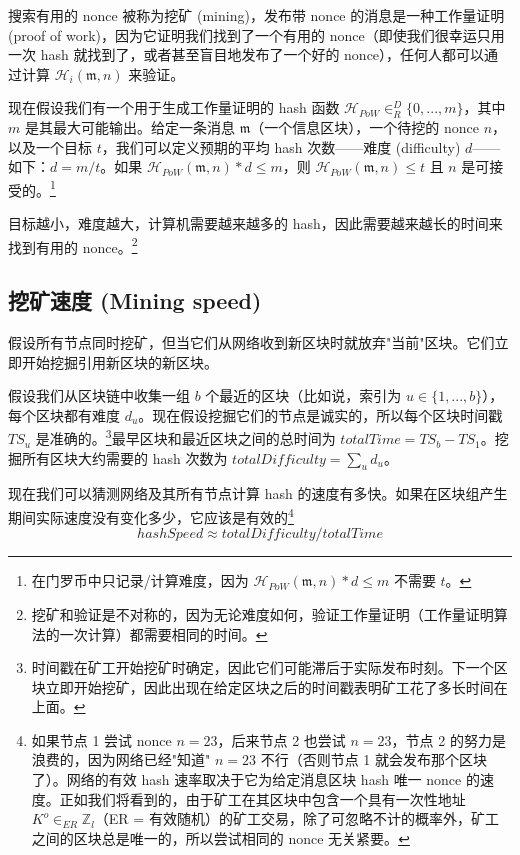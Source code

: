 搜索有用的 nonce 被称为{挖矿 (mining)}，发布带 nonce 的消息是一种{工作量证明 (proof of work)}，因为它证明我们找到了一个有用的 nonce（即使我们很幸运只用一次 hash 就找到了，或者甚至盲目地发布了一个好的 nonce），任何人都可以通过计算 $\mathcal{H}_i(\mathfrak{m},n)$ 来验证。

现在假设我们有一个用于生成工作量证明的 hash 函数 $\mathcal{H}_{PoW} \in^D_R \{0,...,m\}$，其中 $m$ 是其最大可能输出。给定一条消息 $\mathfrak{m}$（一个信息区块），一个待挖的 nonce $n$，以及一个目标 $t$，我们可以定义预期的平均 hash 次数——{难度 (difficulty)} $d$——如下：$d = m/t$。如果 $\mathcal{H}_{PoW}(\mathfrak{m},n)*d \leq m$，则 $\mathcal{H}_{PoW}(\mathfrak{m},n) \leq t$ 且 $n$ 是可接受的。\footnote{在门罗币中只记录/计算难度，因为 $\mathcal{H}_{PoW}(\mathfrak{m},n)*d \leq m$ 不需要 $t$。}

目标越小，难度越大，计算机需要越来越多的 hash，因此需要越来越长的时间来找到有用的 nonce。\footnote{挖矿和验证是不对称的，因为无论难度如何，验证工作量证明（工作量证明算法的一次计算）都需要相同的时间。}


\subsection{挖矿速度 (Mining speed)}

假设所有节点同时挖矿，但当它们从网络收到新区块时就放弃"当前"区块。它们立即开始挖掘引用新区块的新区块。

假设我们从区块链中收集一组 $b$ 个最近的区块（比如说，索引为 $u \in \{1,...,b\}$），每个区块都有难度 $d_u$。现在假设挖掘它们的节点是诚实的，所以每个区块时间戳 ${TS}_u$ 是准确的。\footnote{时间戳在矿工{开始}挖矿时确定，因此它们可能滞后于实际发布时刻。下一个区块立即开始挖矿，因此出现在给定区块{之后}的时间戳表明矿工花了多长时间在上面。}最早区块和最近区块之间的总时间为 $\mathit{totalTime} = {TS}_b - {TS}_1$。挖掘所有区块大约需要的 hash 次数为 $\mathit{totalDifficulty} = \sum_u d_u$。

现在我们可以猜测网络及其所有节点计算 hash 的速度有多快。如果在区块组产生期间实际速度没有变化多少，它应该是有效的\footnote{如果节点 1 尝试 nonce $n = 23$，后来节点 2 也尝试 $n = 23$，节点 2 的努力是浪费的，因为网络已经"知道" $n = 23$ 不行（否则节点 1 就会发布那个区块了）。网络的{有效} hash 速率取决于它为给定消息区块 hash {唯一} nonce 的速度。正如我们将看到的，由于矿工在其区块中包含一个具有一次性地址 $K^o \in_{ER} \mathbb{Z}_l$（ER = 有效随机）的矿工交易，除了可忽略不计的概率外，矿工之间的区块总是唯一的，所以尝试相同的 nonce 无关紧要。}%
\[\mathit{hashSpeed} \approx \mathit{totalDifficulty}/\mathit{totalTime}\]

